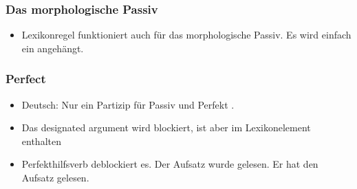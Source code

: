 \subsubsection{Das morphologische Passiv}



\begin{itemize}
\item Lexikonregel funktioniert auch für das morphologische Passiv. Es wird einfach ein  angehängt.
\end{itemize}






\subsubsection{Perfect}

\begin{itemize}
\item Deutsch: Nur ein Partizip für Passiv und Perfekt \citep{Haider86}. 

\item Das designated argument wird blockiert, ist aber im Lexikonelement enthalten

\item Perfekthilfsverb deblockiert es.
\eal
\ex
Der Aufsatz wurde gelesen.
\ex
Er hat den Aufsatz gelesen.
\zl



\end{itemize}



